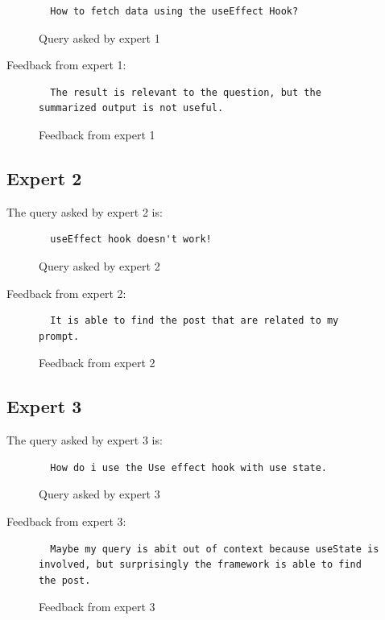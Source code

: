 \begin{figure}[H]
\noindent\begin{lstlisting}
  How to fetch data using the useEffect Hook?
\end{lstlisting}
\caption{Query asked by expert 1}
\label{fig:query-asked-by-expert-1}
\end{figure}

Feedback from expert 1:

\begin{figure}[H]
\noindent\begin{lstlisting}
  The result is relevant to the question, but the summarized output is not useful.
\end{lstlisting}
\caption{Feedback from expert 1}
\label{fig:feedback-from-expert-1}
\end{figure}

\subsection{Expert 2} \label{survey_expert_2}
The query asked by expert 2 is:
\begin{figure}[H]
\noindent\begin{lstlisting}
  useEffect hook doesn't work!
\end{lstlisting}
\caption{Query asked by expert 2}
\label{fig:query-asked-by-expert-2}
\end{figure}

Feedback from expert 2:
\begin{figure}[H]
\noindent\begin{lstlisting}
  It is able to find the post that are related to my prompt.
\end{lstlisting}
\caption{Feedback from expert 2}
\label{fig:feedback-from-expert-2}
\end{figure}

\subsection{Expert 3} \label{survey_expert_3}
The query asked by expert 3 is:

\begin{figure}[H]
\noindent\begin{lstlisting}
  How do i use the Use effect hook with use state.
\end{lstlisting}
\caption{Query asked by expert 3}
\label{fig:query-asked-by-expert-3}
\end{figure}

Feedback from expert 3:
\begin{figure}[H]
\noindent\begin{lstlisting}
  Maybe my query is abit out of context because useState is involved, but surprisingly the framework is able to find the post.
\end{lstlisting}
\caption{Feedback from expert 3}
\label{fig:feedback-from-expert-3}
\end{figure}

